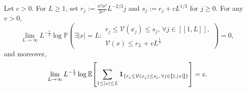 \begin{lemma}[Lemma 3.9]
Let $c>0$. For $L\ge 1$, set $r_j:=\frac{\pi^2\sigma^2}{2c^2}L^{-2/3}j$ and $s_j:=r_j+cL^{1/3}$ for $j\ge 0$.
For any $v>0$,
\[
    \lim_{L\to\infty}
    L^{-\frac 13}
    \log\mathbb P\left(
        \exists |x|=L:
        \begin{aligned}
        r_j\le\mathcal V(x_j)\le s_j,\,
        \forall j\in[\![1,L]\!],\\
        \mathcal V(x)\le r_L+vL^{\frac 13}
        \end{aligned}
    \right)
    =
    0,
\]
and moreover,
\[
    \lim_{L\to\infty}
    L^{-\frac 13}
    \log\mathbb E\!\left[
        \sum_{1\le |x|\le L}
        {\bf 1}_{
            \{
                r_j\le\mathcal V(x_j)\le s_j,\,
                \forall j\in[\![1,|x|]\!]
            \}
        }
    \right]
    =
    c.
\]
\end{lemma}

